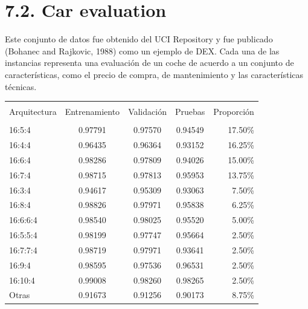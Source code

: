 \documentclass[spanish,a4paper,12pt,twoside]{report}
\begin{document}
  \section*{\Large 7.2. Car evaluation}
  Este conjunto de datos fue obtenido del UCI Repository y fue publicado (Bohanec and Rajkovic, 1988) como un ejemplo de DEX. Cada una de las instancias representa una evaluación de un coche de acuerdo a un conjunto de características, como el precio de compra, de mantenimiento y las características técnicas. \par
\begin{center}
     \label{table}
    \begin{tabular}{l c c c r}
      \hline \\ [-2ex]
      Arquitectura & Entrenamiento & Validación & Pruebas & Proporción \\ [0.5ex]
      \hline \\ [-1ex]
      16:5:4 & 0.97791 & 0.97570 & 0.94549 & 17.50\% \\ 
      16:4:4 & 0.96435 & 0.96364 & 0.93152 & 16.25\% \\
      16:6:4 & 0.98286 & 0.97809 & 0.94026 & 15.00\% \\
      16:7:4 & 0.98715 & 0.97813 & 0.95953 & 13.75\% \\
      16:3:4 & 0.94617 & 0.95309 & 0.93063 & 7.50\% \\
      16:8:4 & 0.98826 & 0.97971 & 0.95838 & 6.25\% \\
      16:6:6:4 & 0.98540 & 0.98025 & 0.95520 & 5.00\% \\
      16:5:5:4 & 0.98199 & 0.97747 & 0.95664 & 2.50\% \\
      16:7:7:4 & 0.98719 & 0.97971 & 0.93641 & 2.50\% \\
      16:9:4 & 0.98595 & 0.97536 & 0.96531 & 2.50\% \\
      16:10:4 & 0.99008 & 0.98260 & 0.98265 & 2.50\% \\
      Otras & 0.91673 & 0.91256 & 0.90173 & 8.75\% \\[1ex]
      \hline
    \end{tabular}
  \end{center} \par
\end{document}
